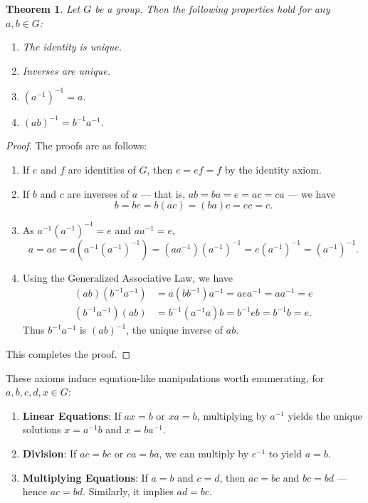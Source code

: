 \documentclass[11pt]{article}
\newtheorem{theorem}{Theorem}
\begin{document}
\begin{adjustwidth}{0.5cm}{}
  \begin{theorem}
    Let $G$ be a group. Then the following properties hold for any $a, b \in G$:
    \begin{enumerate}
      \item The identity is unique.
      \item Inverses are unique.
      \item $(a^{-1})^{-1} = a$.
      \item $(ab)^{-1} = b^{-1}a^{-1}$.
    \end{enumerate}
  \end{theorem}
  \begin{proof}
    The proofs are as follows:
    \begin{enumerate}
      \item If $e$ and $f$ are identities of $G$, then $e = ef = f$ by the identity axiom.
      \item If $b$ and $c$ are inverses of $a$ --- that is, $ab = ba = e = ac = ca$ --- we have
      \[
        b = be = b(ac) = (ba)c = ec = c.
      \]
      \item As $a^{-1}(a^{-1})^{-1} = e$ and $a a^{-1} = e$,
      \[
        a = ae = a(a^{-1}(a^{-1})^{-1}) = (a a^{-1})(a^{-1})^{-1} = e(a^{-1})^{-1} = (a^{-1})^{-1}.
      \]
      \item Using the Generalized Associative Law, we have
      \begin{align*}
        (ab)(b^{-1}a^{-1}) &= a(b b^{-1})a^{-1} = ae a^{-1} = a a^{-1} = e \\
        (b^{-1}a^{-1})(ab) &= b^{-1}(a^{-1}a)b = b^{-1}eb = b^{-1}b = e.
      \end{align*}
      Thus $b^{-1}a^{-1}$ is $(ab)^{-1}$, the unique inverse of $ab$.
    \end{enumerate}
    This completes the proof.
  \end{proof}
\end{adjustwidth}

\newpage

These axioms induce equation-like manipulations worth enumerating, for $a, b, c, d, x \in G$:
\begin{enumerate}
  \item \textbf{Linear Equations}: If $ax = b$ or $xa = b$, multiplying by $a^{-1}$ yields the unique solutions $x = a^{-1}b$ and $x = ba^{-1}$.
  \item \textbf{Division}: If $ac = bc$ or $ca = ba$, we can multiply by $c^{-1}$ to yield $a = b$.
  \item \textbf{Multiplying Equations}: If $a = b$ and $c = d$, then $ac = bc$ and $bc = bd$ --- hence $ac = bd$. Similarly, it implies $ad = bc$.
\end{enumerate}
\end{document}
